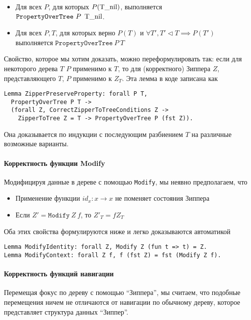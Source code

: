 \begin{itemize}
\item Для всех $P$, для которых $P(\operatorname{T\_nil})$, выполняется $\texttt{PropertyOverTree}\ P\ \btnil$.
\item Для всех $P, T$, для которых верно $P(T)$ и $\forall T', T' \triangleleft T \implies P(T')$ выполняется $\texttt{PropertyOverTree}\ P\ T$
\end{itemize}

Свойство, которое мы хотим доказать, можно переформулировать так: если для некоторого дерева $T$ $P$ применимо к $T$, то для (корректного) Зиппера $Z$, представляющего $T$, $P$ применимо к $Z_T$. Эта лемма в коде записана как
\begin{lstlisting}
Lemma ZipperPreserveProperty: forall P T,
  PropertyOverTree P T ->
  (forall Z, CorrectZipperToTreeConditions Z ->
    ZipperToTree Z = T -> PropertyOverTree P (fst Z)).
\end{lstlisting}
Она доказывается по индукции с последующим разбиением $T$ на различные возможные варианты.

\paragraph{Корректность функции Modify}

Модифицируя данные в дереве с помощью \texttt{Modify}, мы неявно предполагаем, что
\begin{itemize}
\item Применение функции $id_x : x \rightarrow x$ не поменяет состояния Зиппера
\item Если $Z' = \texttt{Modify}\ Z\ f$, то $Z'_T = f Z_T$
\end{itemize}

Оба этих свойства формулируются ниже и легко доказываются автоматикой \tcoq
\begin{lstlisting}
Lemma ModifyIdentity: forall Z, Modify Z (fun t => t) = Z.
Lemma ModifyContext: forall Z f, f (fst Z) = fst (Modify Z f).
\end{lstlisting}

\paragraph{Корректность функций навигации}

Перемещая фокус по дереву с помощью ``Зиппера'', мы считаем, что подобные перемещения ничем не отличаются от навигации по обычному дереву, которое представляет структура данных ``Зиппер''.

